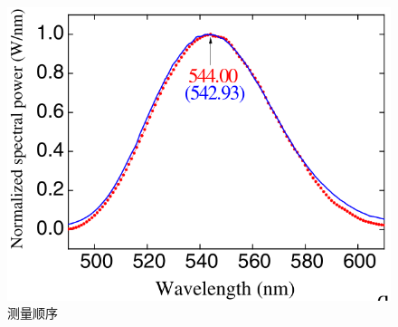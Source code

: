 \begin{frame}[c]
\begin{columns}
\begin{column}{.5\textwidth}
\begin{figure}[!htb]
                \includegraphics[width=1.\textwidth]{figures/Miniature spectrometer based on diffraction in a dispersive hole array_3.png} %
                \caption{测量顺序}
            \end{figure}
        \end{column}
    \end{columns}
\end{frame}

